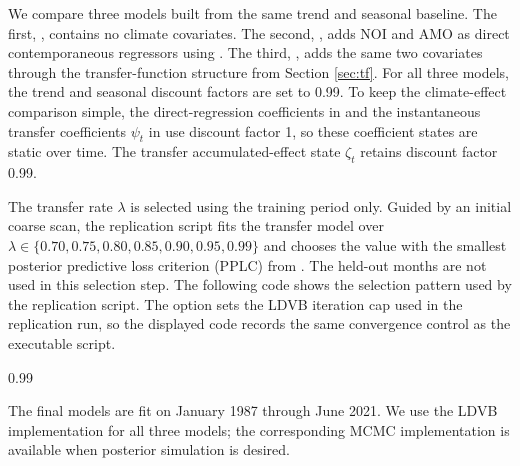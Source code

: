 \documentclass{jss}
\begin{document}
We compare three models built from the same trend and seasonal baseline. The
first, , contains no climate covariates. The second, , adds
NOI and AMO as direct contemporaneous regressors using . The
third, , adds the same two covariates through the transfer-function
structure from Section \ref{sec:tf}. For all three models, the trend and
seasonal discount factors are set to 0.99. To keep the climate-effect
comparison simple, the direct-regression coefficients in  and the
instantaneous transfer coefficients \(\psi_t\) in  use discount
factor 1, so these coefficient states are static over time. The transfer
accumulated-effect state \(\zeta_t\) retains discount factor 0.99.

The transfer rate \(\lambda\) is selected using the training period only. Guided
by an initial coarse scan, the replication script fits the transfer model over
\(\lambda\in\{0.70,0.75,0.80,0.85,0.90,0.95,0.99\}\) and chooses the value with
the smallest posterior predictive loss criterion (PPLC) from
. The held-out months are not used in this selection
step. The following code shows the selection pattern used by the replication
script. The option  sets the LDVB iteration cap used in
the replication run, so the displayed code records the same convergence control
as the executable script.

\begin{CodeChunk}
\begin{CodeOutput}
[1] 0.99
\end{CodeOutput}
\end{CodeChunk}

The final models are fit on January 1987 through June 2021. We use the LDVB implementation for all three models; the corresponding MCMC implementation is available when posterior simulation is desired.
\end{document}
